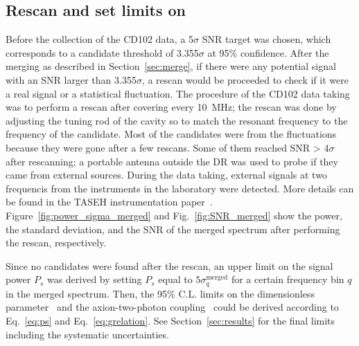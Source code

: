 \subsection{Rescan and set limits on \gagg} 
Before the collection of the CD102 data, a 5$\sigma$ SNR target was chosen, 
which corresponds to a candidate threshold of 3.355$\sigma$ at 95\% confidence.
 After the merging as described in Section~\ref{sec:merge}, if there were 
any potential signal with an SNR larger than 
3.355$\sigma$, a rescan would be proceeded to check if it were a real signal or 
a statistical fluctuation. 
The procedure of the CD102 data taking was to perform a rescan after 
covering every 10~MHz; the rescan was done by adjusting the tuning rod of the 
cavity so to match the resonant frequency to the frequency of the candidate. 
Most of the candidates were from the fluctuations because they were gone 
after a few rescans. 
Some of them reached SNR > 4$\sigma$ after rescanning; a portable 
antenna outside the DR was used to probe if they came from external sources. 
During the data taking, external signals at two frequencis from the instruments
in the laboratory were detected. More details can be found in the 
TASEH instrumentation paper~\cite{TASEHInstrumentation}. 
Figure~\ref{fig:power_sigma_merged} and Fig.~\ref{fig:SNR_merged} show the 
power, the standard deviation, and the SNR of the merged spectrum after 
performing the rescan, respectively. 

Since no candidates were found after the rescan, an upper limit on 
the signal power $P_s$ was derived by setting $P_s$ equal to 
$5\sigma_{q}^\text{merged}$ for a certain frequency bin $q$ in the merged 
spectrum.  Then, the 95\% C.L. limits on the dimensionless parameter 
\ggamma\ and the axion-two-photon coupling \gagg\ could be derived 
according to Eq.~\eqref{eq:ps} and Eq.~\eqref{eq:grelation}. 
See Section~\ref{sec:results} for the final limits including the systematic 
uncertainties.

